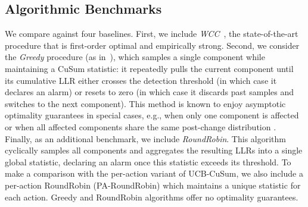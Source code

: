 \documentclass[letterpaper, 10 pt, conference]{ieeeconf}  %
\begin{document}
\subsection{Algorithmic Benchmarks}
We compare against four baselines.
First, we include \emph{WCC}~\cite{veeravalli2024quickest}, the state-of-the-art procedure that is first-order optimal and empirically strong.
Second, we consider the \emph{Greedy} procedure (as in~\cite{xu2023asymptotic}), which samples a single component while maintaining a CuSum statistic: it repeatedly pulls the current component until its cumulative LLR either crosses the detection threshold (in which case it declares an alarm) or resets to zero (in which case it discards past samples and switches to the next component).
This method is known to enjoy asymptotic optimality guarantees in special cases, e.g., when only one component is affected or when all affected components share the same post-change distribution \cite{xu2021optimum,chaudhuri2021sequential}.
Finally, as an additional benchmark, we include \emph{RoundRobin}. This algorithm cyclically samples all components and aggregates the resulting LLRs into a single global statistic, declaring an alarm once this statistic exceeds its threshold. To make a comparison with the per-action variant of UCB-CuSum, we also include a per-action RoundRobin (PA-RoundRobin) which maintains a unique statistic for each action. Greedy and RoundRobin algorithms offer no optimality guarantees.
\end{document}
